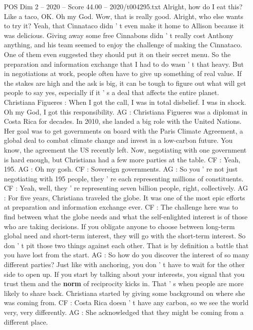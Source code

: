 \begin{textsample}{POS Dim 2 – 2020 – Score 44.00 – 2020/t004295.txt}
Alright, how do I eat this?
Like a taco, OK.
Oh my God.
Wow, that is really good.
Alright, who else wants to try it?
Yeah, that Cinnataco didn ' t even make it home to Allison because it was delicious.
Giving away some free Cinnabons didn ' t really cost Anthony anything, and his team seemed to enjoy the challenge of making the Cinnataco.
One of them even suggested they should put it on their secret menu.
So the preparation and information exchange that I had to do wasn ' t that heavy.
But in negotiations at work, people often have to give up something of real value.
If the stakes are high and the ask is big, it can be tough to figure out what will get people to say yes, especially if it ' s a deal that affects the entire planet.
Christiana Figueres : When I got the call, I was in total disbelief.
I was in shock.
Oh my God, I got this responsibility.
AG : Christiana Figueres was a diplomat in Costa Rica for decades.
In 2010, she landed a big role with the United Nations.
Her goal was to get governments on board with the Paris Climate Agreement, a global deal to combat climate change and invest in a low-carbon future.
You know, the agreement the US recently left.
Now, negotiating with one government is hard enough, but Christiana had a few more parties at the table.
CF : Yeah, 195.
AG : Oh my gosh.
CF : Sovereign governments.
AG : So you ' re not just negotiating with 195 people, they ' re each representing millions of constituents.
CF : Yeah, well, they ' re representing seven billion people, right, collectively.
AG : For five years, Christiana traveled the globe.
It was one of the most epic efforts at preparation and information exchange ever.
CF : The challenge here was to find between what the globe needs and what the self-enlighted interest is of those who are taking decisions.
If you obligate anyone to choose between long-term global need and short-term interest, they will go with the short-term interest.
So don ' t pit those two things against each other.
That is by definition a battle that you have lost from the start.
AG : So how do you discover the interest of so many different parties?
Just like with anchoring, you don ' t have to wait for the other side to open up.
If you start by talking about your interests, you signal that you trust them and the \textbf{norm} of reciprocity kicks in.
That ' s when people are more likely to share back.
Christiana started by giving some background on where she was coming from.
CF : Costa Rica doesn ' t have any carbon, so we see the world very, very differently.
AG : She acknowledged that they might be coming from a different place.

\end{textsample}
